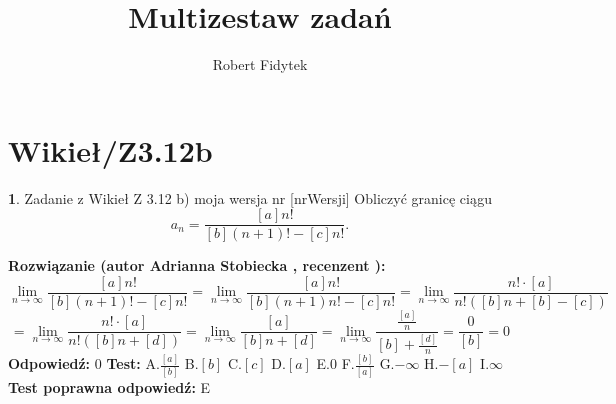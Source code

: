 \documentclass[12pt, a4paper]{article}
\title{Multizestaw zadań}
\author{Robert Fidytek}
\date{}
\theoremstyle{definition} %
\newtheorem{zad}{}
\newcommand{\kategoria}[1]{\section{#1}} %
\newcommand{\zadStart}[1]{\begin{zad}#1\newline} %
\newcommand{\zadStop}{\end{zad}}   %
\newcommand{\rozwStart}[2]{\noindent \textbf{Rozwiązanie (autor #1 , recenzent #2): }\newline} %
\newcommand{\rozwStop}{\newline}                                            %
\newcommand{\odpStart}{\noindent \textbf{Odpowiedź:}\newline}    %
\newcommand{\odpStop}{\newline}                                             %
\newcommand{\testStart}{\noindent \textbf{Test:}\newline} %
\newcommand{\testStop}{\newline} %
\newcommand{\kluczStart}{\noindent \textbf{Test poprawna odpowiedź:}\newline} %
\newcommand{\kluczStop}{\newline} %
\begin{document}
\maketitle


\kategoria{Wikieł/Z3.12b}
\zadStart{Zadanie z Wikieł Z 3.12 b) moja wersja nr [nrWersji]}
Obliczyć granicę ciągu 
$$a_n=\frac{[a]n!}{[b](n+1)!-[c]n!}.$$
\zadStop
\rozwStart{Adrianna Stobiecka}{}
$$\lim_{n\to\infty}\frac{[a]n!}{[b](n+1)!-[c]n!}=\lim_{n\to\infty}\frac{[a]n!}{[b](n+1)n!-[c]n!}=\lim_{n\to\infty}\frac{n!\cdot[a]}{n!([b]n+[b]-[c])}$$
$$=\lim_{n\to\infty}\frac{n!\cdot[a]}{n!([b]n+[d])}=\lim_{n\to\infty}\frac{[a]}{[b]n+[d]}=\lim_{n\to\infty}\frac{\frac{[a]}{n}}{[b]+\frac{[d]}{n}}=\frac{0}{[b]}=0$$
\rozwStop
\odpStart
 $0$
\odpStop
\testStart
A.$\frac{[a]}{[b]}$
B.$[b]$
C.$[c]$
D.$[a]$
E.$0$
F.$\frac{[b]}{[a]}$
G.$-\infty$
H.$-[a]$
I.$\infty$
\testStop
\kluczStart
E
\kluczStop
\end{document}
